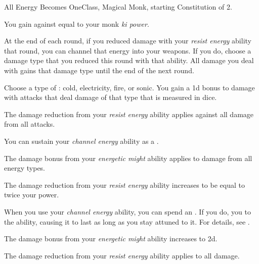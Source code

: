     \begin{feat}{All Energy Becomes One}{Class, Magical}
        \featpre Monk, starting Constitution of 2.

         You gain  against  equal to your monk \textit{ki power}.

         At the end of each round, if you reduced damage with your \textit{resist energy} ability that round, you can channel that energy into your weapons.
        If you do, choose a damage type that you reduced this round with that ability.
        All damage you deal with  gains that damage type until the end of the next round.

         Choose a type of : cold, electricity, fire, or sonic.
        You gain a \plus1d bonus to damage with attacks that deal damage of that type that is measured in dice.

         The damage reduction from your \textit{resist energy} ability applies against all damage from all  attacks.

         You can sustain your \textit{channel energy} ability as a .

         The damage bonus from your \textit{energetic might} ability applies to damage from all energy types.

         The damage reduction from your \textit{resist energy} ability increases to be equal to twice your \ki power.

         When you use your \textit{channel energy} ability, you can spend an .
        If you do, you  to the ability, causing it to last as long as you stay attuned to it.
        For details, see .

         The damage bonus from your \textit{energetic might} ability increases to \plus2d.

         The damage reduction from your \textit{resist energy} ability applies to all damage.
    \end{feat}

